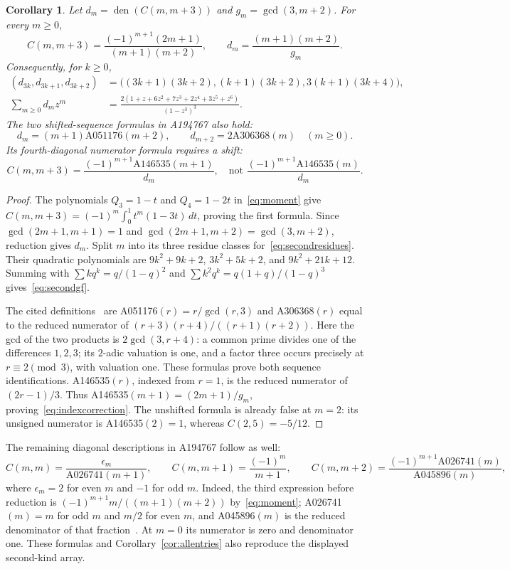 \documentclass[11pt]{article}
\newtheorem{corollary}[theorem]{Corollary}
\begin{document}
\begin{corollary}\label{cor:secondkind}
Let $d_m=\operatorname{den}(C(m,m+3))$ and $g_m=\gcd(3,m+2)$.
For every $m\ge0$,
\begin{equation}\label{eq:secondkind}
 C(m,m+3)=\frac{(-1)^{m+1}(2m+1)}{(m+1)(m+2)},\qquad
 d_m=\frac{(m+1)(m+2)}{g_m}.
\end{equation}
Consequently, for $k\ge0$,
\begin{align}\label{eq:secondresidues}
 (d_{3k},d_{3k+1},d_{3k+2})
 &=\bigl((3k+1)(3k+2),(k+1)(3k+2),3(k+1)(3k+4)\bigr),\\
\label{eq:secondgf}
 \sum_{m\ge0}d_mz^m
 &=\frac{2(1+z+6z^2+7z^3+2z^4+3z^5+z^6)}{(1-z^3)^3}.
\end{align}
The two shifted-sequence formulas in A194767 also hold:
\[
 d_m=(m+1)\mathrm{A051176}(m+2),\qquad
 d_{m+2}=2\mathrm{A306368}(m)\quad(m\ge0).
\]
Its fourth-diagonal numerator formula requires a shift:
\begin{equation}\label{eq:indexcorrection}
 C(m,m+3)=\frac{(-1)^{m+1}\mathrm{A146535}(m+1)}{d_m},
 \quad\text{not }\frac{(-1)^{m+1}\mathrm{A146535}(m)}{d_m}.
\end{equation}
\end{corollary}
\begin{proof}
The polynomials $Q_3=1-t$ and $Q_4=1-2t$ in~\eqref{eq:moment} give
$C(m,m+3)=(-1)^m\int_0^1t^m(1-3t)\,dt$, proving the first formula.
Since $\gcd(2m+1,m+1)=1$ and
$\gcd(2m+1,m+2)=\gcd(3,m+2)$, reduction gives $d_m$.
Split $m$ into its three residue classes for~\eqref{eq:secondresidues}.
Their quadratic polynomials are $9k^2+9k+2$, $3k^2+5k+2$, and
$9k^2+21k+12$. Summing with
$\sum kq^k=q/(1-q)^2$ and
$\sum k^2q^k=q(1+q)/(1-q)^3$ gives~\eqref{eq:secondgf}.

The cited definitions~\cite{secondauxiliary} are
A051176$(r)=r/\gcd(r,3)$ and A306368$(r)$ equal to the reduced numerator of
$(r+3)(r+4)/((r+1)(r+2))$.
Here the gcd of the two products is $2\gcd(3,r+4)$: a common prime divides
one of the differences $1,2,3$; its $2$-adic valuation is one, and a factor
three occurs precisely at $r\equiv2\pmod3$, with valuation one.
These formulas prove both sequence identifications.
A146535$(r)$, indexed from $r=1$, is the reduced numerator of $(2r-1)/3$.
Thus A146535$(m+1)=(2m+1)/g_m$, proving~\eqref{eq:indexcorrection}.
The unshifted formula is already false at $m=2$: its unsigned numerator is
A146535$(2)=1$, whereas $C(2,5)=-5/12$.
\end{proof}

The remaining diagonal descriptions in A194767 follow as well:
\[
 C(m,m)=\frac{\epsilon_m}{\mathrm{A026741}(m+1)},\qquad
 C(m,m+1)=\frac{(-1)^m}{m+1},\qquad
 C(m,m+2)=\frac{(-1)^{m+1}\mathrm{A026741}(m)}{\mathrm{A045896}(m)},
\]
where $\epsilon_m=2$ for even $m$ and $-1$ for odd $m$.
Indeed, the third expression before reduction is
$(-1)^{m+1}m/((m+1)(m+2))$ by~\eqref{eq:moment};
A026741$(m)=m$ for odd $m$ and $m/2$ for even $m$, and A045896$(m)$
is the reduced denominator of that fraction~\cite{secondauxiliary}.
At $m=0$ its numerator is zero and denominator one. These formulas and
Corollary~\ref{cor:allentries} also reproduce the displayed second-kind array.
\end{document}
